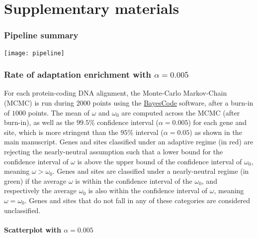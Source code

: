 \documentclass{article}
\renewcommand*{\bm}[1]{#1}%
\begin{document}
\part*{Supplementary materials}
\tableofcontents
 
\pagebreak

\section{Pipeline summary}
\label{subsec:method-summary}

\begin{center}
    \texttt{[image: pipeline]}
\end{center}

\pagebreak
\section{Rate of adaptation enrichment with $\alpha=0.005$}
\label{sec:threshold}
For each protein-coding DNA alignment, the Monte-Carlo Markov-Chain (MCMC) is run during $2000$ points using the \href{https://github.com/bayesiancook/bayescode}{BayesCode} software, after a burn-in of $1000$ points.
The mean of $\omega$ and $\omega_{0}$ are computed across the MCMC (after burn-in), as well as the $\bm{99.5}$\% confidence interval ($\alpha=0.005$) for each gene and site, which is more stringent than the $95$\% interval ($\alpha=0.05$) as shown in the main manuscript.
Genes and sites classified under an adaptive regime (in red) are rejecting the nearly-neutral assumption such that a lower bound for the confidence interval of $\omega$ is above the upper bound of the confidence interval of $\omega_{0}$, meaning $\omega > \omega_{0}$.
Genes and sites are classified under a nearly-neutral regime (in green) if the average $\omega$ is within the confidence interval of the $\omega_{0}$, and respectively the average $\omega_{0}$ is also within the confidence interval of  $\omega$, meaning $\omega = \omega_{0}$.
Genes and sites that do not fall in any of these categories are considered unclassified.

\subsection{Scatterplot with $\alpha=0.005$}
\end{document}
